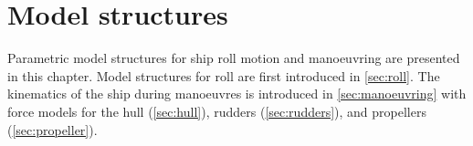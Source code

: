 \chapter{Model structures}
\label{ch:models}
Parametric model structures for ship roll motion and manoeuvring are presented in this chapter. Model structures for roll are first introduced in \autoref{sec:roll}. 
The kinematics of the ship during manoeuvres is introduced in \autoref{sec:manoeuvring} with force models for the hull (\autoref{sec:hull}), rudders (\autoref{sec:rudders}), and propellers (\autoref{sec:propeller}).






%
%
%